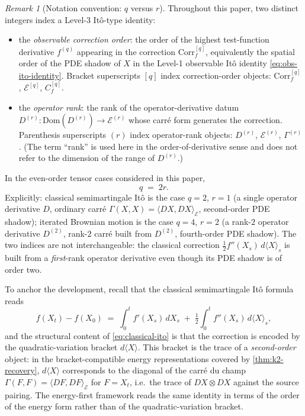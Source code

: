 \documentclass[11pt,reqno]{amsart}
\theoremstyle{plain}
\theoremstyle{definition}
\theoremstyle{remark}
\newtheorem{remark}[theorem]{Remark}
\newcommand{\Dom}{\mathrm{Dom}}
\newcommand{\Energy}{\mathcal{E}}
\newcommand{\Carre}{\Gamma}
\begin{document}
\begin{remark}[Notation convention: $q$ versus $r$]
\label{rem:q-r-convention}
Throughout this paper, two distinct integers index a Level-3
It\^o-type identity:
\begin{itemize}
\item[$q$ ---] the \emph{observable correction order}: the order of
  the highest test-function derivative $f^{(q)}$ appearing in the
  correction $\mathrm{Corr}_f^{[q]}$, equivalently the spatial order
  of the PDE shadow of $X$ in the Level-1 observable It\^o identity
  \eqref{eq:obs-ito-identity}. Bracket superscripts $[q]$ index
  correction-order objects: $\mathrm{Corr}_f^{[q]}$, $\Energy^{[q]}$,
  $C_f^{[q]}$.
\item[$r$ ---] the \emph{operator rank}: the rank of the
  operator-derivative datum $D^{(r)}\colon\Dom(D^{(r)})\to
  \Energy^{(r)}$ whose carr\'e form generates the correction.
  Parenthesis superscripts $(r)$ index operator-rank objects:
  $D^{(r)}$, $\Energy^{(r)}$, $\Carre^{(r)}$. (The term ``rank'' is
  used here in the order-of-derivative sense and does not refer to the
  dimension of the range of $D^{(r)}$.)
\end{itemize}
In the even-order tensor cases considered in this paper,
\begin{equation*}
  q\;=\;2r.
\end{equation*}
Explicitly: classical semimartingale It\^o is the case $q=2$, $r=1$
(a single operator derivative $D$, ordinary carr\'e
$\Carre(X,X)=\langle DX,DX\rangle_\Energy$, second-order PDE shadow);
iterated Brownian motion is the case $q=4$, $r=2$ (a rank-$2$
operator derivative $D^{(2)}$, rank-$2$ carr\'e built from $D^{(2)}$,
fourth-order PDE shadow). The two indices are not interchangeable: the
classical correction $\tfrac12 f''(X_s)\,d\langle X\rangle_s$ is built
from a \emph{first}-rank operator derivative even though its PDE
shadow is of order two.
\end{remark}

To anchor the development, recall that the classical semimartingale
It\^o formula reads
\begin{equation}\label{eq:classical-ito}
  f(X_t)-f(X_0)
  \;=\;\int_0^t f'(X_s)\,dX_s
   \;+\;\tfrac12\!\int_0^t f''(X_s)\,d\langle X\rangle_s,
\end{equation}
and the structural content of \eqref{eq:classical-ito} is that the
correction is encoded by the quadratic-variation bracket
$d\langle X\rangle$. This bracket is the trace of a
\emph{second-order} object: in the bracket-compatible energy
representations covered by \cref{thm:k2-recovery},
$d\langle X\rangle$ corresponds to the diagonal of the carr\'e du
champ $\Carre(F,F)=\langle DF,DF\rangle_\Energy$ for $F=X_t$,
i.e.~the trace of $DX\otimes DX$ against the source pairing. The
energy-first framework reads the same identity in terms of the order
of the energy form rather than of the quadratic-variation bracket.
\end{document}
